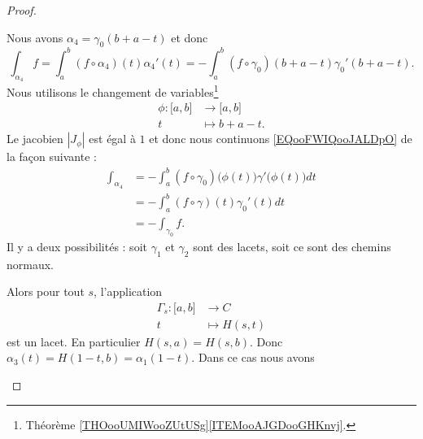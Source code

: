 \begin{proof}
\begin{subproof}
     Nous avons \( \alpha_4=\gamma_0(b+a-t)\) et donc
    \begin{equation}        \label{EQooFWIQooJALDpO}
            \int_{\alpha_4}f=\int_a^b(f\circ \alpha_4)(t)\alpha_4'(t)= -\int_a^b(f\circ \gamma_0)(b+a-t)\gamma_0'(b+a-t).
    \end{equation}
    Nous utilisons le changement de variables\footnote{Théorème \ref{THOooUMIWooZUtUSg}\ref{ITEMooAJGDooGHKnvj}.}
    \begin{equation}
        \begin{aligned}
            \phi\colon \mathopen[ a , b \mathclose]&\to \mathopen[ a , b \mathclose] \\
            t&\mapsto b+a-t .
        \end{aligned}
    \end{equation}
    Le jacobien \( | J_{\phi} |\) est égal à \( 1\) et donc nous continuons \eqref{EQooFWIQooJALDpO} de la façon suivante :
    \begin{subequations}
        \begin{align}
            \int_{\alpha_4}&=-\int_a^b(f\circ\gamma_0)\big( \phi(t) \big)\gamma'\big( \phi(t) \big)dt\\
            &=-\int_a^b(f\circ\gamma)(t)\gamma_0'(t)dt\\
            &=-\int_{\gamma_0}f.
        \end{align}
    \end{subequations}
    Il y a deux possibilités : soit \( \gamma_1\) et \( \gamma_2\) sont des lacets, soit ce sont des chemins normaux.
    \begin{subproof}
        Alors pour tout \( s\), l'application
        \begin{equation}
            \begin{aligned}
                \Gamma_s\colon \mathopen[ a , b \mathclose]&\to C \\
                t&\mapsto H(s,t) 
            \end{aligned}
        \end{equation}
        est un lacet. En particulier \( H(s,a)=H(s,b)\). Donc \( \alpha_3(t)=H(1-t,b)=\alpha_1(1-t)\). Dans ce cas nous avons
        \begin{subequations}

\end{subequations}
\end{subproof}
\end{subproof}
\end{proof}

